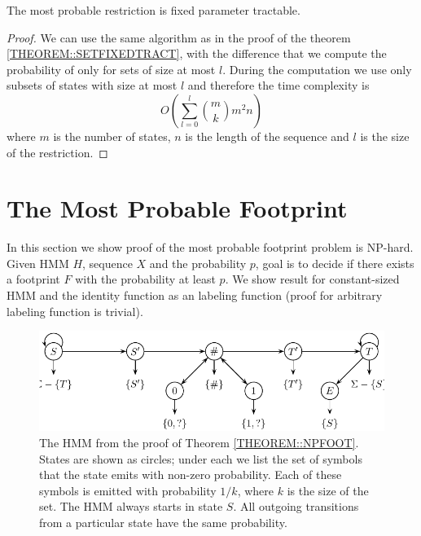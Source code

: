 \begin{theorem}
The most probable restriction is fixed parameter tractable.
\end{theorem}
\begin{proof}
We can use the same algorithm as in the proof of the theorem
\ref{THEOREM::SETFIXEDTRACT}, with the difference that we compute the
probability of only for sets of size at most $l$. During the computation we use
only subsets of states with size at most $l$ and therefore the time complexity
is 
\begin{equation}
O\left(\sum_{l=0}^l{m\choose k}m^2n\right)
\end{equation}
where $m$ is the number of states, $n$ is the length of the sequence and $l$ is
the size of the restriction.
\end{proof}

\section{The Most Probable Footprint}
\label{sec:footprint}

In this section we show proof of the most probable footprint problem is
NP-hard.  Given HMM $H$, sequence $X$ and the probability $p$, goal is to
decide if there exists a footprint $F$ with the probability at least $p$. We
show result for constant-sized HMM and the identity function as an labeling
function (proof for arbitrary labeling function is trivial).
\begin{figure}
\centerline{\includegraphics[scale=0.68]{../figures/jcss/cliquehmm.pdf}}
\caption[HMM for which footprint is NP-hard to optimize]{\label{fig:footprint_hmm} The HMM from the proof of Theorem
  \ref{THEOREM::NPFOOT}. States are shown as circles; under each we
  list the set of symbols that the state emits with non-zero
  probability. Each of these symbols is emitted with probability
  $1/k$, where $k$ is the size of the set. The HMM always starts in
  state $S$. All outgoing transitions from a particular state have
  the same probability.}
\end{figure}

